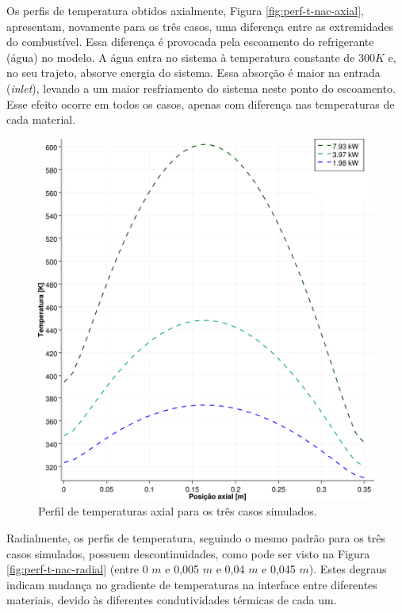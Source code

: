 Os perfis de temperatura obtidos axialmente, Figura \ref{fig:perf-t-nac-axial},
apresentam, novamente para os três casos, uma diferença entre as extremidades
do combustível. Essa diferença é provocada pela escoamento do refrigerante (água) no
modelo. A água entra no sistema à temperatura constante de $300 K$ e, no seu trajeto,
absorve energia do sistema. Essa absorção é maior na entrada (\textit{inlet}),
levando a um maior resfriamento do sistema neste ponto do escoamento. Esse efeito
ocorre em todos os casos, apenas com diferença nas temperaturas de cada material.

\begin{figure}[htb]
  \caption{Perfil de temperaturas axial para os três casos simulados.}
  \centering\includegraphics[scale=0.5]{figuras/T_z_NC_square_port.png}
\end{figure}

Radialmente, os perfis de temperatura, seguindo o mesmo padrão para os três casos simulados,
possuem descontinuidades, como pode ser visto na Figura \ref{fig:perf-t-nac-radial} (entre
0 $m$ e 0,005 $m$ e 0,04 $m$ e 0,045 $m$). Estes degraus indicam mudança no gradiente de temperaturas na
interface entre diferentes materiais, devido às diferentes condutividades térmicas de cada um.

